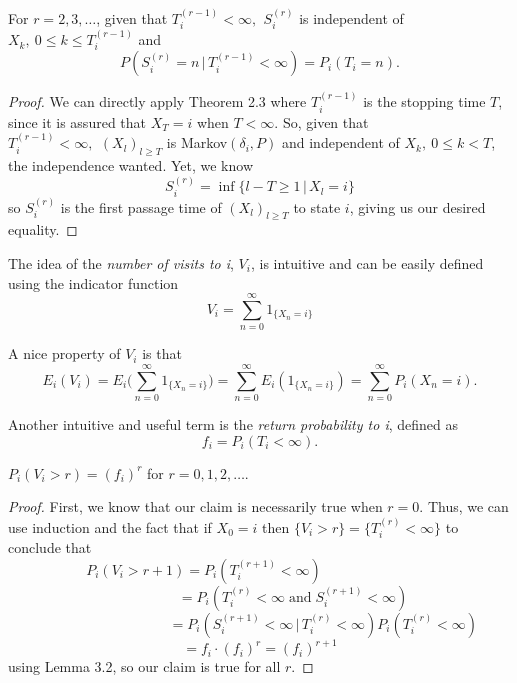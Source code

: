 \begin{lem} For $r=2,3,\ldots$, given that $T_i^{(r-1)} < \infty, \:\,S_i^{(r)}$ is independent of $X_k, \: 0 \leq k \leq T_i^{(r-1)}$ and
\[P(S_i^{(r)}=n\,|\,T_i^{(r-1)} < \infty)=P_i(T_i=n).\]
\end{lem}
\begin{proof} We can directly apply Theorem 2.3 where $T_i^{(r-1)}$ is the stopping time $T$, since it is assured that $X_T=i$ when $T < \infty$. So, given that $T_i^{(r-1)} <  \infty, \:\,(X_l)_{ l\geq T}$ is Markov$(\delta_i,P)$ and independent of $X_k,\: 0 \leq k < T$, the independence wanted. Yet, we know
\[S_i^{(r)}=\inf\{l-T \geq 1\,|\,X_l=i\}\]
so $S_i^{(r)}$ is the first passage time of $(X_l)_{ l\geq T}$ to state $i$, giving us our desired equality.
\end{proof}

\begin{defn} The idea of the \emph{number of visits to i}, $V_i$, is intuitive and can be easily defined using the indicator function
\[V_i=\sum_{n=0}^{\infty}1_{\{X_n=i\}}\]
\end{defn}
A nice property of $V_i$ is that
\[E_i(V_i)=E_i \Big( \sum_{n=0}^{\infty}1_{\{X_n=i\}} \Big)=\sum_{n=0}^{\infty}E_i(1_{\{X_n=i\}})=\sum_{n=0}^{\infty}P_i(X_n=i).\]
\begin{defn} Another intuitive and useful term is the \emph{return probability to i}, defined as
\[f_i=P_i(T_i<\infty).\]
\end{defn}

\begin{lem} $P_i(V_i>r)=(f_i)^r$ for $r=0,1,2,\ldots.$
\end{lem}
\begin{proof} First, we know that our claim is necessarily true when $r=0$. Thus, we can use induction and the fact that if $X_0=i$ then $\{V_i>r\}=\{T_i^{(r)}<\infty\}$ to conclude that
\[P_i(V_i>r+1)=P_i(T_i^{(r+1)}<\infty) \qquad\qquad\qquad\qquad\]
\[\qquad\qquad\;\;\,=P_i(T_i^{(r)}<\infty \; \textrm{and} \; S_i^{(r+1)}<\infty)\]
\[\qquad\qquad\qquad\qquad\;\;\;\:=P_i(S_i^{(r+1)}<\infty\,|\,T_i^{(r)}<\infty)P_i(T_i^{(r)}<\infty)\]
\[\!\!\!=f_i\cdot(f_i)^r=(f_i)^{r+1}\]
using Lemma 3.2, so our claim is true for all $r$.
\end{proof}

